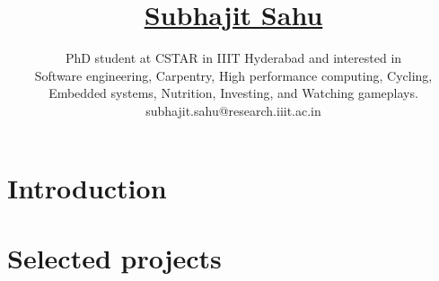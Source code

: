 \documentclass[11pt]{article}
\title{
  \vspace{-6ex}
  \href{https://wolfram77.github.io/}{Subhajit Sahu}
  \vspace{-4ex}
}
\author{
  PhD student at CSTAR in IIIT Hyderabad and interested in \\
  Software engineering, Carpentry, High performance computing, Cycling, \\
  Embedded systems, Nutrition, Investing, and Watching gameplays. \\
  {\small subhajit.sahu@research.iiit.ac.in}
}
\date{}
\begin{document}
\maketitle
\vspace{-9ex}

\section{Introduction}
\label{sec:introduction}




% 

\section{Selected projects}


\appendix
\small


\end{document}
